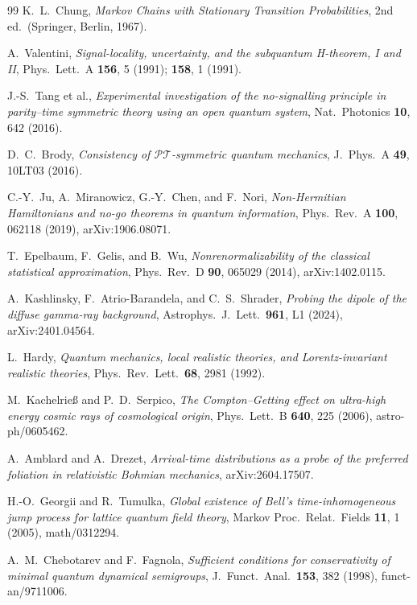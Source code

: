 \documentclass[11pt]{article}
\theoremstyle{definition}
\theoremstyle{remark}
\newcommand{\PT}{\mathcal{PT}}
\begin{document}
\begin{thebibliography}{99}
K.~L.~Chung,
\emph{Markov Chains with Stationary Transition Probabilities},
2nd ed.\ (Springer, Berlin, 1967).

A.~Valentini,
\emph{Signal-locality, uncertainty, and the subquantum H-theorem, I
and II},
Phys.\ Lett.\ A \textbf{156}, 5 (1991); \textbf{158}, 1 (1991).

J.-S.~Tang et al.,
\emph{Experimental investigation of the no-signalling principle in
parity--time symmetric theory using an open quantum system},
Nat.\ Photonics \textbf{10}, 642 (2016).

D.~C.~Brody,
\emph{Consistency of $\PT$-symmetric quantum mechanics},
J.\ Phys.\ A \textbf{49}, 10LT03 (2016).

C.-Y.~Ju, A.~Miranowicz, G.-Y.~Chen, and F.~Nori,
\emph{Non-Hermitian Hamiltonians and no-go theorems in quantum
information},
Phys.\ Rev.\ A \textbf{100}, 062118 (2019), arXiv:1906.08071.

T.~Epelbaum, F.~Gelis, and B.~Wu,
\emph{Nonrenormalizability of the classical statistical
approximation},
Phys.\ Rev.\ D \textbf{90}, 065029 (2014), arXiv:1402.0115.

A.~Kashlinsky, F.~Atrio-Barandela, and C.~S.~Shrader,
\emph{Probing the dipole of the diffuse gamma-ray background},
Astrophys.\ J.\ Lett.\ \textbf{961}, L1 (2024), arXiv:2401.04564.

L.~Hardy,
\emph{Quantum mechanics, local realistic theories, and
Lorentz-invariant realistic theories},
Phys.\ Rev.\ Lett.\ \textbf{68}, 2981 (1992).

M.~Kachelrie{\ss} and P.~D.~Serpico,
\emph{The Compton--Getting effect on ultra-high energy cosmic rays
of cosmological origin},
Phys.\ Lett.\ B \textbf{640}, 225 (2006), astro-ph/0605462.

A.~Amblard and A.~Drezet,
\emph{Arrival-time distributions as a probe of the preferred
foliation in relativistic Bohmian mechanics},
arXiv:2604.17507.

H.-O.~Georgii and R.~Tumulka,
\emph{Global existence of Bell's time-inhomogeneous jump process
for lattice quantum field theory},
Markov Proc.\ Relat.\ Fields \textbf{11}, 1 (2005), math/0312294.

A.~M.~Chebotarev and F.~Fagnola,
\emph{Sufficient conditions for conservativity of minimal quantum
dynamical semigroups},
J.\ Funct.\ Anal.\ \textbf{153}, 382 (1998), funct-an/9711006.


\end{thebibliography}
\end{document}

